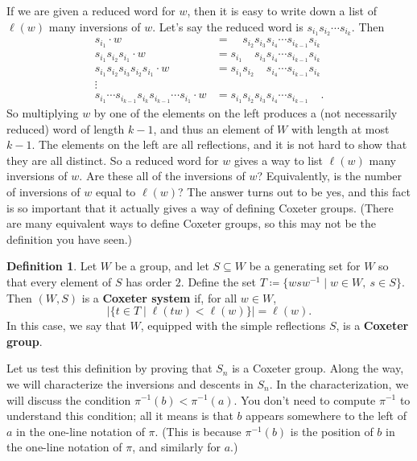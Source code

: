 \documentclass{article}
\numberwithin{equation}{section}
\newcommand{\newword}[1]{\textbf{#1}}
\theoremstyle{remark}
\theoremstyle{definition}
\newtheorem{definition}[theorem]{Definition}
\begin{document}
	If we are given a reduced word for $w$, then it is easy to write down a list of $\ell(w)$ many inversions of $w$. Let's say the reduced word is $s_{i_1}s_{i_2}\cdots s_{i_k}$. Then 
	\begin{align*}
		s_{i_1} \cdot w &=  \phantom{s_{i_1}}s_{i_2}s_{i_3}s_{i_4} \cdots s_{i_{k-1}}s_{i_k} \\
		s_{i_1}s_{i_2}s_{i_1} \cdot w &= s_{i_1}\phantom{s_{i_2}} s_{i_3}s_{i_4}\cdots s_{i_{k-1}}s_{i_k} \\ 
		s_{i_1}s_{i_2}s_{i_3}s_{i_2}s_{i_1} \cdot w &=s_{i_1} s_{i_2}\phantom{s_{i_3}}s_{i_4}\cdots s_{i_{k-1}}s_{i_k} \\
		\vdots\\ 
		s_{i_1}\cdots s_{i_{k-1}}s_{i_k}s_{i_{k-1}}\cdots s_{i_1} \cdot w &= s_{i_1} s_{i_2}s_{i_3}s_{i_4}\cdots s_{i_{k-1}}\phantom{s_{i_k}}.
	\end{align*}
	So multiplying $w$ by one of the elements on the left produces a (not necessarily reduced) word of length $k-1$, and thus an element of $W$ with length at most $k-1$. The elements on the left are all reflections, and it is not hard to show that they are all distinct. So a reduced word for $w$ gives a way to list $\ell(w)$ many inversions of $w$. Are these all of the inversions of $w$? Equivalently, is the number of inversions of $w$ equal to $\ell(w)$? The answer turns out to be yes, and this fact is so important that it actually gives a way of defining Coxeter groups. (There are many equivalent ways to define Coxeter groups, so this may not be the definition you have seen.)
	
	\begin{definition}
		Let $W$ be a group, and let $S\subseteq W$ be a generating set for $W$ so that every element of $S$ has order $2$. Define the set $T\coloneqq \{wsw^{-1}\mid w\in W,~s\in S\}$. Then $(W,S)$ is a \newword{Coxeter system} if, for all $w\in W$,
		\[ |\{t\in T \mid \ell(tw) < \ell(w) \}| = \ell(w). \]
		In this case, we say that $W$, equipped with the simple reflections $S$, is a \newword{Coxeter group}. 
	\end{definition}
	
	Let us test this definition by proving that $S_n$ is a Coxeter group. Along the way, we will characterize the inversions and descents in $S_n$. In the characterization, we will discuss the condition $\pi^{-1}(b)<\pi^{-1}(a)$. You don't need to compute $\pi^{-1}$ to understand this condition; all it means is that $b$ appears somewhere to the left of $a$ in the one-line notation of $\pi$. (This is because $\pi^{-1}(b)$ is the position of $b$ in the one-line notation of $\pi$, and similarly for $a$.)
	
\end{document}
